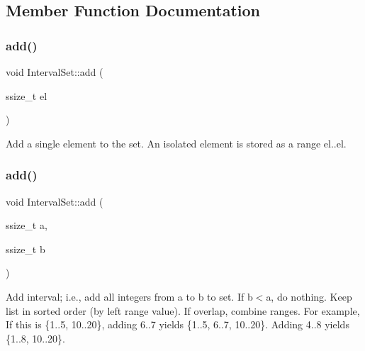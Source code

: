 \subsection{Member Function Documentation}
\mbox{\label{classantlr4_1_1misc_1_1IntervalSet_ad8e72d626d99ce3cc0b7f4d0a973aec4}} 
\subsubsection{\texorpdfstring{add()}{add()}\hspace{0.1cm}{\footnotesize\ttfamily [1/2]}}
{\footnotesize\ttfamily void Interval\+Set\+::add (\begin{DoxyParamCaption}\item[{ssize\+\_\+t}]{el }\end{DoxyParamCaption})}

Add a single element to the set. An isolated element is stored as a range el..el. \mbox{\label{classantlr4_1_1misc_1_1IntervalSet_a4b86051dddc4528980ae54202c58c2ef}} 
\subsubsection{\texorpdfstring{add()}{add()}\hspace{0.1cm}{\footnotesize\ttfamily [2/2]}}
{\footnotesize\ttfamily void Interval\+Set\+::add (\begin{DoxyParamCaption}\item[{ssize\+\_\+t}]{a,  }\item[{ssize\+\_\+t}]{b }\end{DoxyParamCaption})}

Add interval; i.\+e., add all integers from a to b to set. If b$<$a, do nothing. Keep list in sorted order (by left range value). If overlap, combine ranges. For example, If this is \{1..5, 10..20\}, adding 6..7 yields \{1..5, 6..7, 10..20\}. Adding 4..8 yields \{1..8, 10..20\}. \mbox{\label{classantlr4_1_1misc_1_1IntervalSet_a181657a8554e9836bd2dc7c9be0a02f0}} 
